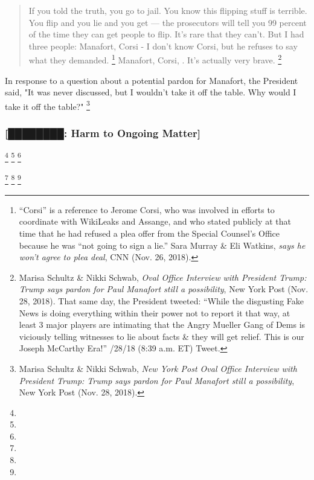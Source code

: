 {\begin{quote}
If you told the truth, you go to jail.
You know this flipping stuff is terrible.
You flip and you lie and you get — the prosecutors will tell you 99 percent of the time they can get people to flip.
It's rare that they can't.
But I had three people: Manafort, Corsi - I don't know Corsi, but he refuses to say what they demanded.%
\footnote{“Corsi” is a reference to Jerome Corsi,  who was involved in efforts to coordinate with WikiLeaks and Assange, and who stated publicly at that time that he had refused a plea offer from the Special Counsel’s Office because he was “not going to sign a lie.”
Sara Murray \& Eli Watkins,  \textit{says he won't agree to plea deal}, CNN (Nov. 26, 2018).}
Manafort, Corsi, .
It's actually very brave.%
\footnote{Marisa Schultz \& Nikki Schwab, \textit{Oval Office Interview with President Trump: Trump says pardon for Paul Manafort still a possibility}, New York Post (Nov. 28, 2018).
That same day, the President tweeted: “While the disgusting Fake News is doing everything within their power not to report it that way, at least 3 major players are intimating that the Angry Mueller Gang of Dems is viciously telling witnesses to lie about facts \& they will get relief.
This is our Joseph McCarthy Era!” /28/18 (8:39 a.m. ET) Tweet.}
\end{quote}

In response to a question about a potential pardon for Manafort, the President said, "It was never discussed, but I wouldn't take it off the table.
Why would I take it off the table?"%
\footnote{Marisa Schultz \& Nikki Schwab, \textit{New York Post Oval Office Interview with President Trump: Trump says pardon for Paul Manafort still a possibility}, New York Post (Nov. 28, 2018).}

\subsubsection{[████████: Harm to Ongoing Matter]}

\footnote{}
\footnote{}
\footnote{}

\footnote{}
\footnote{}
\footnote{}

}
